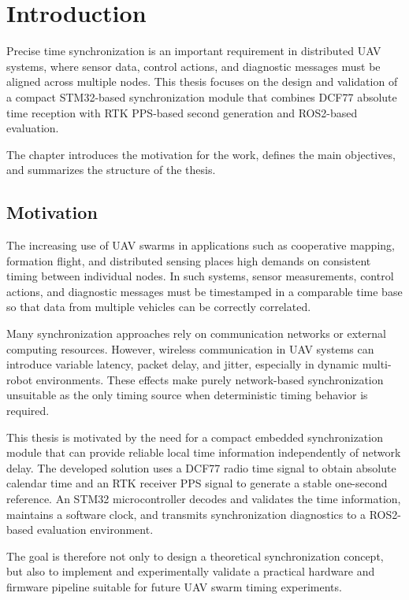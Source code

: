 
\chapter{Introduction\label{chap:introduction}}
Precise time synchronization is an important requirement in distributed UAV systems, where sensor data, control actions, and diagnostic messages must be aligned across multiple nodes. \cite{r1,r2,r7} This thesis focuses on the design and validation of a compact STM32-based synchronization module that combines DCF77 absolute time reception with RTK PPS-based second generation and ROS2-based evaluation.

The chapter introduces the motivation for the work, defines the main objectives, and summarizes the structure of the thesis.

\section{Motivation}

The increasing use of UAV swarms in applications such as cooperative mapping, formation flight, and distributed sensing places high demands on consistent timing between individual nodes. \cite{r1,r2,r7} In such systems, sensor measurements, control actions, and diagnostic messages must be timestamped in a comparable time base so that data from multiple vehicles can be correctly correlated.

Many synchronization approaches rely on communication networks or external computing resources. However, wireless communication in UAV systems can introduce variable latency, packet delay, and jitter, especially in dynamic multi-robot environments. \cite{lopez2021uavmesh} These effects make purely network-based synchronization unsuitable as the only timing source when deterministic timing behavior is required.

This thesis is motivated by the need for a compact embedded synchronization module that can provide reliable local time information independently of network delay. The developed solution uses a DCF77 radio time signal to obtain absolute calendar time and an RTK receiver PPS signal to generate a stable one-second reference. An STM32 microcontroller decodes and validates the time information, maintains a software clock, and transmits synchronization diagnostics to a ROS2-based evaluation environment.

The goal is therefore not only to design a theoretical synchronization concept, but also to implement and experimentally validate a practical hardware and firmware pipeline suitable for future UAV swarm timing experiments.

